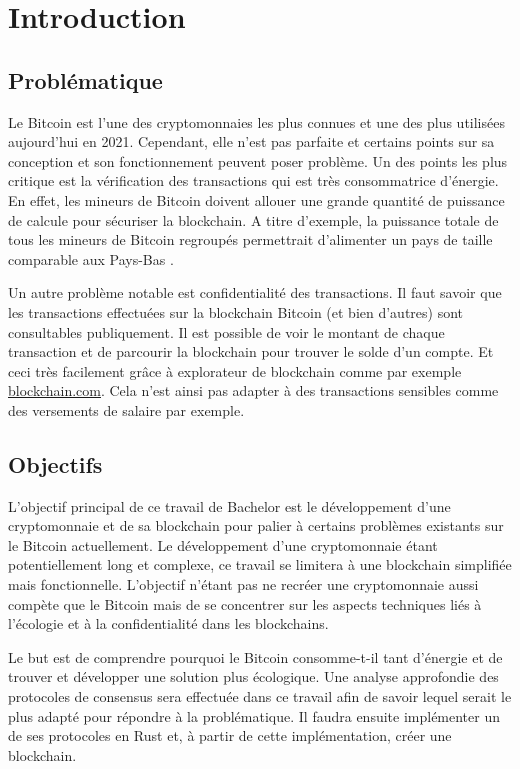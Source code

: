 \chapter{Introduction}
\label{ch:intro}

\section{Problématique}

Le Bitcoin est l'une des cryptomonnaies les plus connues et une des plus utilisées aujourd'hui en 2021. Cependant, elle n'est pas parfaite et certains points sur sa conception et son fonctionnement peuvent poser problème. Un des points les plus critique est la vérification des transactions qui est très consommatrice d'énergie. En effet, les mineurs de Bitcoin doivent allouer une grande quantité de puissance de calcule pour sécuriser la blockchain. A titre d'exemple, la puissance totale de tous les mineurs de Bitcoin regroupés permettrait d'alimenter un pays de taille comparable aux Pays-Bas \cite{BTC_cons}. 

Un autre problème notable est confidentialité des transactions. Il faut savoir que les transactions effectuées sur la blockchain Bitcoin (et bien d'autres) sont consultables publiquement. Il est possible de voir le montant de chaque transaction et de parcourir la blockchain pour trouver le solde d'un compte. Et ceci très facilement grâce à explorateur de blockchain comme par exemple \url{blockchain.com}. Cela n'est ainsi pas adapter à des transactions sensibles comme des versements de salaire par exemple.

\section{Objectifs}

L'objectif principal de ce travail de Bachelor est le développement d'une cryptomonnaie et de sa blockchain pour palier à certains problèmes existants sur le Bitcoin actuellement. Le développement d'une cryptomonnaie étant potentiellement long et complexe, ce travail se limitera à une blockchain simplifiée mais fonctionnelle. L'objectif n'étant pas ne recréer une cryptomonnaie aussi compète que le Bitcoin mais de se concentrer sur les aspects techniques liés à l'écologie et à la confidentialité dans les blockchains.

Le but est de comprendre pourquoi le Bitcoin consomme-t-il tant d'énergie et de trouver et développer une solution plus écologique. Une analyse approfondie des protocoles de consensus sera effectuée dans ce travail afin de savoir lequel serait le plus adapté pour répondre à la problématique. Il faudra ensuite implémenter un de ses protocoles en Rust et, à partir de cette implémentation, créer une blockchain.

